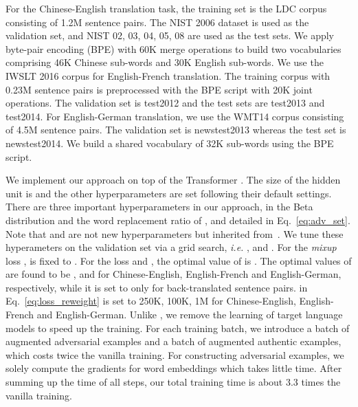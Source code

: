 \documentclass[11pt,a4paper]{article}
\newcommand{\ie}{\emph{i.e. }} \newcommand{\Ie}{\emph{I.e}}
\newcommand{\mixup}{\textit{mixup}\xspace}
\begin{document}
For the Chinese-English translation task, the training set is the LDC corpus consisting of 1.2M sentence pairs. 
The NIST 2006 dataset is used as the validation set, and NIST 02, 03, 04, 05, 08 are used as the test sets.
We apply byte-pair encoding (BPE) \cite{Sennrich:16a} with 60K merge operations to build two vocabularies comprising 46K Chinese sub-words and 30K English sub-words.
We use the IWSLT 2016 corpus for English-French translation. The training corpus with 0.23M sentence pairs is preprocessed with the BPE script with 20K joint operations. The validation set is test2012 and the test sets are test2013 and test2014. For English-German translation, we use the WMT14 corpus consisting of 4.5M sentence pairs. The validation set is newstest2013 whereas the test set is newstest2014. We build a shared vocabulary of 32K sub-words using the BPE script.

We implement our approach on top of the Transformer \cite{Vaswani:17}. The size of the hidden unit is  and the other hyperparameters are set following their default settings. There are three important hyperparameters in our approach,  in the Beta distribution and the word replacement ratio of , and  detailed in Eq.~\eqref{eq:adv_set}. Note that  and  are not new hyperparameters but inherited from~\cite{Cheng:19}. We tune these hyperameters on the validation set via a grid search, \ie ,  and . For the \mixup loss ,  is fixed to . For the loss  and , the optimal value of  is . The optimal values of  are found to be ,  and  for Chinese-English, English-French and English-German, respectively, while it is set to  only for back-translated sentence pairs.  in Eq.~\eqref{eq:loss_reweight} is set to 250K, 100K, 1M for Chinese-English, English-French and English-German.
Unlike \citet{Cheng:19}, we remove the learning of target language models to speed up the training. For each training batch, we introduce a batch of augmented adversarial examples and a batch of augmented authentic examples, which costs twice the vanilla training. For constructing adversarial examples, we solely compute the gradients for word embeddings which takes little time. After summing up the time of all steps, our total training time is about 3.3 times the vanilla training.
\end{document}
